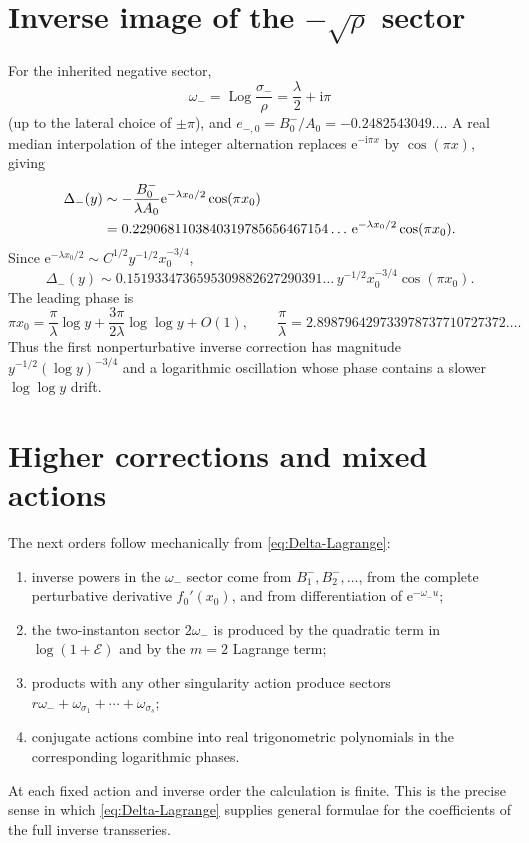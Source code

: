 \documentclass[11pt,a4paper,oneside,openany]{book}
\theoremstyle{definition}
\theoremstyle{remark}
\newcommand{\e}{\mathrm e}
\newcommand{\ii}{\mathrm i}
\DeclareMathOperator{\Log}{Log}
\begin{document}
\section{Inverse image of the \texorpdfstring{$-\sqrt\rho$}{-sqrt(rho)} sector}
For the inherited negative sector,
\begin{equation}
 \omega_- =\Log\frac{\sigma_-}{\rho}
 =\frac\lambda2+\ii\pi
 \label{eq:omega-minus}
\end{equation}
(up to the lateral choice of $\pm\pi$), and
$e_{-,0}=B_0^-/A_0=-0.2482543049\ldots$.  A real median interpolation of the
integer alternation replaces $\e^{-\ii\pi x}$ by $\cos(\pi x)$, giving
\begin{align}
 \Delta_-(y)
 &\sim-\frac{B_0^-}{\lambda A_0}
 \e^{-\lambda x_0/2}\cos(\pi x_0)\notag\\
 &=0.2290681103840319785656467154\ldots\,
 \e^{-\lambda x_0/2}\cos(\pi x_0).
 \label{eq:inverse-minus-x0}
\end{align}
Since
$\e^{-\lambda x_0/2}\sim C^{1/2}y^{-1/2}x_0^{-3/4}$,
\begin{equation}
 \boxed{
 \Delta_-(y)
 \sim0.1519334736595309882627290391\ldots\,
 y^{-1/2}x_0^{-3/4}\cos(\pi x_0).}
 \label{eq:inverse-minus-y}
\end{equation}
The leading phase is
\begin{equation}
 \pi x_0=
 \frac{\pi}{\lambda}\log y+
 \frac{3\pi}{2\lambda}\log\log y+O(1),
 \qquad
 \frac\pi\lambda=2.898796429733978737710727372\ldots .
 \label{eq:minus-phase}
\end{equation}
Thus the first nonperturbative inverse correction has magnitude
$y^{-1/2}(\log y)^{-3/4}$ and a logarithmic oscillation whose phase contains a
slower $\log\log y$ drift.

\section{Higher corrections and mixed actions}
The next orders follow mechanically from \cref{eq:Delta-Lagrange}:
\begin{enumerate}
\item inverse powers in the $\omega_-$ sector come from $B_1^-,B_2^-,\ldots$,
      from the complete perturbative derivative $f_0'(x_0)$, and from
      differentiation of $\e^{-\omega_-u}$;
\item the two-instanton sector $2\omega_-$ is produced by the quadratic term in
      $\log(1+\mathcal E)$ and by the $m=2$ Lagrange term;
\item products with any other singularity action produce sectors
      $r\omega_-+\omega_{\sigma_1}+\cdots+\omega_{\sigma_s}$;
\item conjugate actions combine into real trigonometric polynomials in the
      corresponding logarithmic phases.
\end{enumerate}
At each fixed action and inverse order the calculation is finite.  This is the
precise sense in which \cref{eq:Delta-Lagrange} supplies general formulae for
the coefficients of the full inverse transseries.
\end{document}
